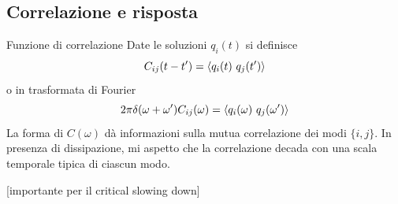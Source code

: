 \documentclass[10pt]{beamer}
\begin{document}
\subsection{Correlazione e risposta}

%  


\begin{frame}{Funzione di correlazione}
 Date le soluzioni $q_i(t)$ si definisce
 \begin{equation*}
   C_{ij} (t-t') = \mean{q_i(t)\ q_j(t')}
 \end{equation*}
 o in trasformata di Fourier
 \begin{equation*}
   2\pi \delta (\omega + \omega') C_{ij}(\omega) = \left \langle q_i(\omega)\ q_j(\omega') \right \rangle
 \end{equation*}
La forma di $C(\omega)$ dà informazioni sulla mutua correlazione dei modi $\{i,j\}$. In presenza di dissipazione, mi aspetto che la correlazione decada con una scala temporale tipica di ciascun modo.

[importante per il critical slowing down]

\end{frame}
\end{document}
